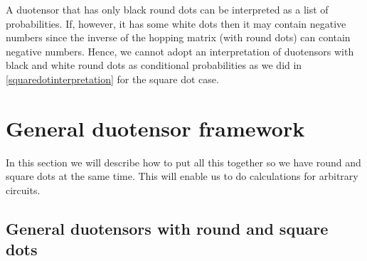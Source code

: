 \documentclass[10pt]{article}
\begin{document}
A duotensor that has only black round dots can be interpreted as a list of probabilities.  If, however, it has some white dots then it may contain negative numbers since the inverse of the hopping matrix (with round dots) can contain negative numbers.  Hence, we cannot adopt an interpretation of duotensors with black and white round dots as conditional probabilities as we did in \eqref{squaredotinterpretation} for the square dot case.

\section{General duotensor framework}

In this section we will describe how to put all this together so we have round and square dots at the same time.  This will enable us to do calculations for arbitrary circuits.

\subsection{General duotensors with round and square dots}\label{sec:generalduotensorswithroundandsquaredots}
\end{document}
